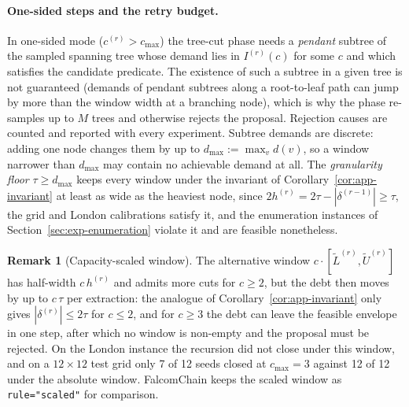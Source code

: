 \documentclass[preprint,12pt,authoryear]{elsarticle}
\theoremstyle{definition}
\newtheorem{remark}[theorem]{Remark}
\begin{document}
\paragraph{One-sided steps and the retry budget.}
In one-sided mode ($c^{(r)}>c_{\max}$) the tree-cut phase needs a
\emph{pendant} subtree of the sampled spanning tree whose demand lies in
$I^{(r)}(c)$ for some $c$ and which satisfies the candidate predicate. The
existence of such a subtree in a given tree is not guaranteed (demands of
pendant subtrees along a root-to-leaf path can jump by more than the
window width at a branching node), which is why the phase re-samples up to $M$ trees and otherwise rejects the proposal. Rejection causes are counted and reported with every experiment. Subtree demands are discrete: adding one node changes them by up to $d_{\max}:=\max_{v}d(v)$, so a window narrower than $d_{\max}$ may contain no achievable demand at all. The \emph{granularity floor} $\tau\ge d_{\max}$ keeps every window under the invariant of Corollary~\ref{cor:app-invariant} at least as wide as the heaviest node, since $2h^{(r)}=2\tau-|\delta^{(r-1)}|\ge\tau$, the grid and London calibrations satisfy it, and the enumeration instances of Section~\ref{sec:exp-enumeration} violate it and are feasible nonetheless.

\begin{remark}[Capacity-scaled window]\label{rem:app-scaled}
The alternative window $c\cdot[\widetilde L^{(r)},\widetilde U^{(r)}]$ has
half-width $c\,h^{(r)}$ and admits more cuts for $c\ge2$, but the debt
then moves by up to $c\,\tau$ per extraction: the analogue of
Corollary~\ref{cor:app-invariant} only gives $|\delta^{(r)}|\le 2\tau$ for
$c\le 2$, and for $c\ge 3$ the debt can leave the feasible envelope in one
step, after which no window is non-empty and the proposal must be
rejected. On the London instance the recursion did not close under this
window, and on a $12\times12$ test grid only 7 of 12 seeds closed at
$c_{\max}=3$ against 12 of 12 under the absolute window. FalcomChain keeps
the scaled window as \texttt{rule="scaled"} for comparison.
\end{remark}
\end{document}
